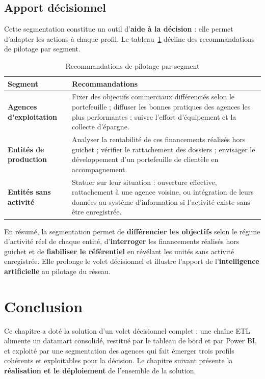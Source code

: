 \subsection{Apport décisionnel}
Cette segmentation constitue un outil d'\textbf{aide à la décision} : elle permet
d'adapter les actions à chaque profil. Le tableau~\ref{tab:reco} décline des
recommandations de pilotage par segment.

\begin{table}[htbp]
\centering
\caption{Recommandations de pilotage par segment}
\label{tab:reco}
\renewcommand{\arraystretch}{1.25}
\begin{tabularx}{\textwidth}{|>{\bfseries}p{3.4cm}|X|}
\hline
\textmd{\textbf{Segment}} & \textbf{Recommandations}\\
\hline
Agences d'exploitation & Fixer des objectifs commerciaux différenciés selon le
portefeuille ; diffuser les bonnes pratiques des agences les plus performantes ;
suivre l'effort d'équipement et la collecte d'épargne.\\
\hline
Entités de production & Analyser la rentabilité de ces financements réalisés hors
guichet ; vérifier le rattachement des dossiers ; envisager le développement d'un
portefeuille de clientèle en accompagnement.\\
\hline
Entités sans activité & Statuer sur leur situation : ouverture effective,
rattachement à une agence voisine, ou intégration de leurs données au système
d'information si l'activité existe sans être enregistrée.\\
\hline
\end{tabularx}
\end{table}

En résumé, la segmentation permet de \textbf{différencier les objectifs} selon le
régime d'activité réel de chaque entité, d'\textbf{interroger} les financements
réalisés hors guichet et de \textbf{fiabiliser le référentiel} en révélant les
unités sans activité enregistrée. Elle prolonge le volet décisionnel
et illustre l'apport de l'\textbf{intelligence artificielle} au pilotage du réseau.

\section*{Conclusion}
Ce chapitre a doté la solution d'un volet décisionnel complet : une chaîne ETL
alimente un datamart consolidé, restitué par le tableau de bord et par Power BI,
et exploité par une segmentation des agences qui fait émerger trois profils
cohérents et exploitables pour la décision. Le chapitre suivant présente la
\textbf{réalisation et le déploiement} de l'ensemble de la solution.
